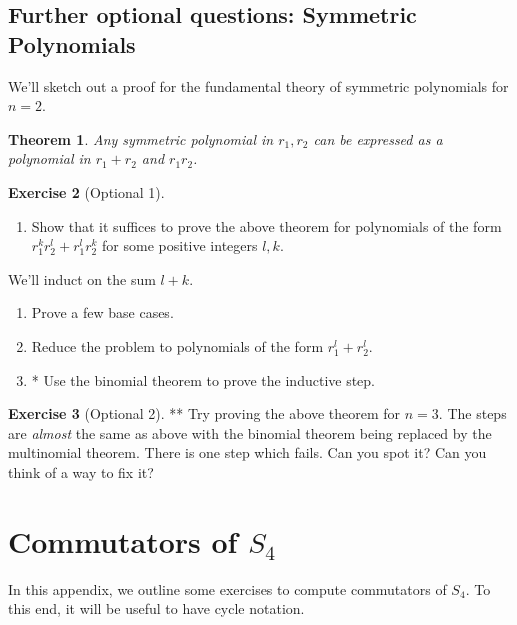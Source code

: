 \documentclass[reqno, 12pt, letter]{article}
\theoremstyle{plain}
\newtheorem{theorem}{Theorem}[section]
\theoremstyle{definition}
\newtheorem{exercise}[theorem]{Exercise}
\theoremstyle{remark}
\numberwithin{equation}{section}
\begin{document}
\subsection{Further optional questions: Symmetric Polynomials}
We'll sketch out a proof for the fundamental theory of symmetric polynomials for $ n=2$.
\begin{theorem}
	\label{theorem:fundamental_theorem_symmetric_polynomials}
	Any symmetric polynomial in $ r_1, r_2$ can be expressed as a polynomial in $ r_1 + r_2$ and $r_1 r_2$.
\end{theorem}
\begin{exercise}[Optional 1]
	\begin{enumerate}
		\item Show that it suffices to prove the above theorem for polynomials of the form $ r_1^k r_2^l + r_1^l r_2^k$ for some positive integers $l,k$.
	\end{enumerate}
	We'll induct on the sum $ l+k$.
	\begin{enumerate}[resume]
		\item Prove a few base cases.
		\item Reduce the problem to polynomials of the form $ r_1^l + r_2^l$.
		\item* Use the binomial theorem to prove the inductive step.
	\end{enumerate}
\end{exercise}

\begin{exercise}[Optional 2] **
	Try proving the above theorem for $ n=3$. The steps are \emph{almost} the same as above with the binomial theorem being replaced by the multinomial theorem. There is one step which fails. Can you spot it? Can you think of a way to fix it?
\end{exercise}
\fi


\newpage
\appendix
\section{Commutators of $S_4$}
\label{appendix:commutators-s4}
In this appendix, we outline some exercises to compute commutators of $S_4$.
To this end, it will be useful to have cycle notation.
\end{document}
